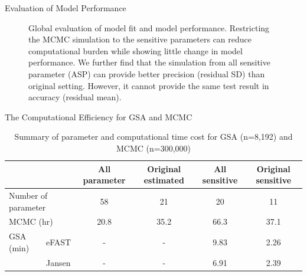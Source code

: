 \documentclass[xcolor=table]{beamer}
\begin{document}
\begin{frame}[t]
\begin{columns}[t]
\begin{column}{0.22\paperwidth}
\begin{block}{Evaluation of Model Performance}
\begin{figure}
\begin{columns}
\caption{Global evaluation of model fit and model performance. Restricting the MCMC simulation to the sensitive parameters can reduce computational burden while showing little change in model performance.
We further find that the simulation from all sensitive parameter (ASP) can provide better precision (residual SD) than original setting.
However, it cannot provide the same test result in accuracy (residual mean). }
\label{fig:example right}
\end{columns}
\end{figure}
\end{block}
%
\begin{block}{The Computational Efficiency for GSA and MCMC}
\begin{table}
\begin{adjustbox}{max width=\textwidth}
\begin{threeparttable}
  \centering
  \caption{Summary of parameter and computational time cost for GSA (n=8,192) and MCMC (n=300,000)}
  \label{tab:table1}
  \begin{tabular}{llcccc}
  \rowcolor{Maroon!30}   
    \toprule
    &  & All parameter & Original estimated & All sensitive & Original sensitive \\
    \midrule
    \multicolumn{2}{l}{Number of parameter} & 58 & 21 & 20 & 11 \\
    \multicolumn{2}{l}{MCMC (hr)} & 20.8 & 35.2 & 66.3 & 37.1 \\
	    GSA (min) & eFAST & - & - & 9.83 & 2.26 \\
	   \multirow{2}{*}{} & Jansen & - & - & 6.91 & 2.39 \\

\end{tabular}
\end{threeparttable}
\end{adjustbox}
\end{table}
\end{block}
\end{column}
\end{columns}
\end{frame}
\end{document}
